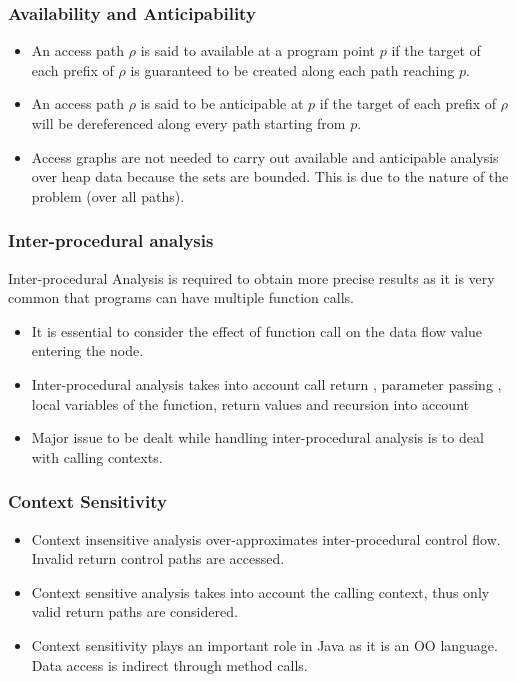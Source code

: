 \documentclass{beamer}
\begin{document}
\begin{frame}
\frametitle{Availability and Anticipability}
	\begin{itemize}
		\item An access path $\rho$ is said to available at a program point $p$ if the target of each prefix of $\rho$ is guaranteed to be created along each path reaching $p$.
		\item An access path $\rho$ is said to be anticipable at $p$ if the target of each prefix of $\rho$ will be dereferenced along every path starting from $p$.
		\item Access graphs are not needed to carry out available and anticipable analysis over heap data because the sets are bounded. This is due to the nature of the problem (over all paths).
	\end{itemize}
\end{frame}

  \begin{frame}
  \frametitle{Inter-procedural analysis}
  Inter-procedural Analysis is required to obtain more precise results as it is very common that programs can have multiple function calls.
  \begin{itemize}
	\item It is essential to consider the effect of function call on the data flow value entering the node.
	\item Inter-procedural analysis takes into account call return , parameter passing , local variables of the function, return values and recursion into account
	\item Major issue to be dealt while handling inter-procedural analysis is to deal with calling contexts.
	\end{itemize}
  \end{frame}
  
  \begin{frame}
  \frametitle{Context Sensitivity}
\begin{itemize}
	\item Context insensitive analysis over-approximates inter-procedural control flow. Invalid return control paths are accessed.
	\item Context sensitive analysis takes into account the calling context, thus only valid return paths are considered.
	\item Context sensitivity plays an important role in Java as it is an OO language. Data access is indirect through method calls.
\end{itemize}

  \end{frame}
  
\end{document}
